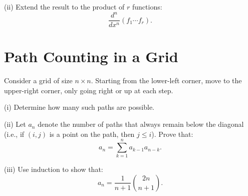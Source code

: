 \documentclass[lang=cn,11pt]{elegantbook}
\begin{document}
(ii) Extend the result to the product of $r$ functions:
\[
\frac{d^n}{dx^n}(f_1 \cdots f_r).
\]

\section{Path Counting in a Grid}
Consider a grid of size $n \times n$. Starting from the lower-left corner, move to the upper-right corner, only going right or up at each step.

(i) Determine how many such paths are possible.

(ii) Let $a_n$ denote the number of paths that always remain below the diagonal (i.e., if $(i, j)$ is a point on the path, then $j \leq i$). Prove that:
\[
a_n = \sum_{k=1}^n a_{k-1} a_{n-k}.
\]

(iii) Use induction to show that:
\[
a_n = \frac{1}{n+1}\binom{2n}{n+1}.
\]
\end{document}
